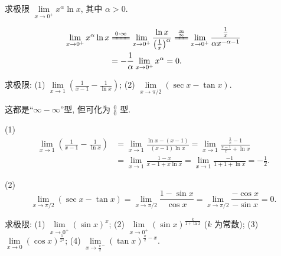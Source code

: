 \begin{example}\label{ex:3.4.3}
求极限 $\lim\limits_{x\to0^{+}}x^{\alpha}\ln x$, 其中 $\alpha>0$.
\end{example}

\begin{solution}
\[
\begin{aligned}
\lim_{x\to0^{+}}x^{\alpha}\ln x&\xlongequal{0\cdot\infty}\lim_{x\to0^{+}}\frac{\ln x}{\left(\frac{1}{x}\right)^{\alpha}}\xlongequal{\frac{\infty}{\infty}}\lim_{x\to0^{+}}\frac{\frac{1}{x}}{\alpha x^{-\alpha-1}}\\
&=-\frac{1}{\alpha}\lim_{x\to0^{+}}x^{\alpha}=0.
\end{aligned}
\]
\end{solution}

\begin{example}\label{ex:3.4.4}
求极限:
(1) $\lim\limits_{x\to1}\left(\frac{1}{x-1}-\frac{1}{\ln x}\right)$; \quad (2) $\lim\limits_{x\to\pi/2}(\sec x-\tan x)$.
\end{example}

\begin{solution}
这都是“$\infty-\infty$”型, 但可化为 $\frac{0}{0}$ 型.

(1)
\[
\begin{aligned}
\lim_{x\to1}\left(\frac{1}{x-1}-\frac{1}{\ln x}\right)&=\lim_{x\to1}\frac{\ln x-(x-1)}{(x-1)\ln x}=\lim_{x\to1}\frac{\frac{1}{x}-1}{\frac{x-1}{x}+\ln x}\\
&=\lim_{x\to1}\frac{1-x}{x-1+x\ln x}=\lim_{x\to1}\frac{-1}{1+1+\ln x}=-\frac{1}{2}.
\end{aligned}
\]

(2)
\[
\lim_{x\to\pi/2}(\sec x-\tan x)=\lim_{x\to\pi/2}\frac{1-\sin x}{\cos x}=\lim_{x\to\pi/2}\frac{-\cos x}{-\sin x}=0.
\]
\end{solution}

\begin{example}\label{ex:3.4.5}
求极限:
(1) $\lim\limits_{x\to0^{+}}(\sin x)^{x}$; \quad (2) $\lim\limits_{x\to0^{+}}(\sin x)^{\frac{k}{1+\ln x}}$ ($k$ 为常数);
(3) $\lim\limits_{x\to0}(\cos x)^{\frac{1}{x^{2}}}$; \quad (4) $\lim\limits_{x\to\frac{\pi}{2}^{-}}(\tan x)^{\frac{\pi}{2}-x}$.
\end{example}

